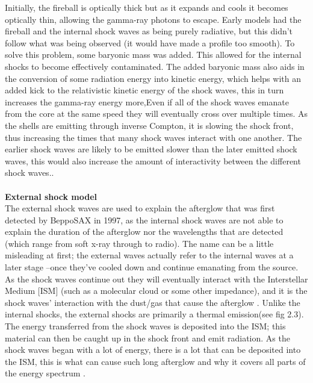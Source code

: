 Initially, the fireball is optically thick but as it expands and cools it becomes optically thin, allowing the gamma-ray photons to escape. Early models had the fireball and the internal shock waves as being purely radiative, but this didn't follow what was being observed (it would have made a profile too smooth). To solve this problem, some baryonic mass was added. This allowed for the internal shocks to become effectively contaminated. The added baryonic mass also aids in the conversion of some radiation energy into kinetic energy, which helps with an added kick to the relativistic kinetic energy of the shock waves, this in turn increases the gamma-ray energy more,Even if all of the shock waves emanate from the core at the same speed they will eventually cross over multiple times. As the shells are emitting through inverse Compton, it is slowing the shock front, thus increasing the times that many shock waves interact with one another. The earlier shock waves are likely to be emitted slower than the later emitted shock waves, this would also increase the amount of interactivity between the different shock waves.\citep{10}\citep{18}.\\\\
\textbf{External shock model}\\
The external shock waves are used to explain the afterglow that was first detected by BeppoSAX in 1997, as the internal shock waves are not able to explain the duration of the afterglow nor the wavelengths that are detected (which range from soft x-ray through to radio). The name can be a little misleading at first; the external waves actually refer to the internal waves at a later stage --once they've cooled down and continue emanating from the source. As the shock waves continue out they will eventually interact with the Interstellar Medium [ISM] (such as a molecular cloud or some other impedance), and it is the shock waves' interaction with the dust/gas that cause the afterglow . Unlike the internal shocks, the external shocks are primarily a thermal emission(see fig 2.3). The energy transferred from the shock waves is deposited into the ISM; this material can then be caught up in the shock front and emit radiation. As the shock waves began with a lot of energy, there is a lot that can be deposited into the ISM, this is what can cause such long afterglow and why it covers all parts of the energy spectrum \citep{19}.\\\\
